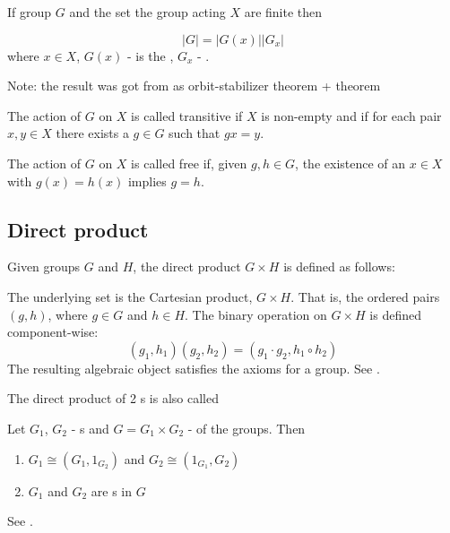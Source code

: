 \begin{appendices}
\begin{theorem}
  If group $G$ and the set the group acting $X$ are finite then

  \[
  \left|G\right| = \left|G\left(x\right)\right|\left|G_x\right|
  \]
  where $x \in X$, $G\left(x\right)$ - is the ,
  $G_x$ - .
  
  Note: the result was got from \cite{wiki:groupaction} as
  orbit-stabilizer theorem +  theorem
  \label{thm:orbitstabilizertheorem}
\end{theorem}

\begin{definition}
  The action of $G$ on $X$ is called \cite{wiki:groupaction}
  transitive if $X$ is non-empty and if for each pair $x, y \in X$ there
  exists a $g \in G$ such that $gx = y$.
  \label{def:transitive}
\end{definition}

\begin{definition}
  The action of $G$ on $X$ is called \cite{wiki:groupaction}
  free if, given $g, h \in G$, the existence of an $x \in X$ with $g(x)
  = h(x)$ implies $g = h$.
  \label{def:freeaction}
\end{definition}

\subsection{Direct product}

\begin{definition}
  Given groups $G$ and $H$, the direct product $G \times H$ is defined as follows:

  The underlying set is the Cartesian product, $G \times H$. That is, the
  ordered pairs $\left(g,h\right)$, where $g \in G$ and $h \in H$. 
  The binary operation on $G \times H$ is defined component-wise:
  \[
  \left(g_1,h_1\right)\left(g_2,h_2\right) =
  \left(g_1 \cdot g_2, h_1 \circ h_2\right)
  \]
  The resulting algebraic object satisfies the axioms for a group.
  See \cite{wiki:directproduct}.

  The direct product of 2 s is also called
  
  \label{def:directproduct}
\end{definition}

\begin{property}
  Let $G_1$, $G_2$ - s and $G = G_1 \times G_2$ -
   of the groups. Then
  \begin{enumerate}
  \item $G_1 \cong \left(G_1, 1_{G_2}\right)$ and
    $G_2 \cong \left(1_{G_1}, G_2\right)$
  \item $G_1$ and $G_2$ are s in $G$
  \end{enumerate}
  See \cite{wiki:directproduct}.
  \label{property:directproduct}
\end{property}


\end{appendices}

